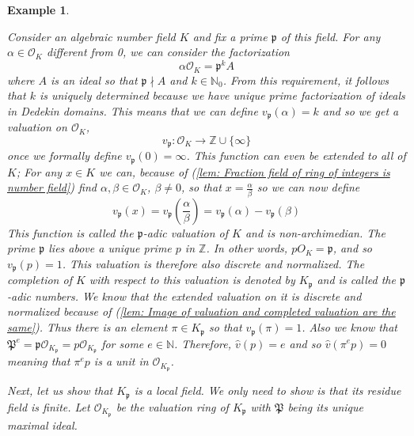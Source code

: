 \documentclass{article}
\newtheorem{example}{Example}[section]
\newcommand{\mfrak}[1]{\mathfrak{#1}}
\newcommand{\mcal}[1]{\mathcal{#1}}
\newcommand{\mbb}[1]{\mathbb{#1}}
\begin{document}
\begin{example}\label{ex: P-adic numbers}


    Consider an algebraic number field $K$ and fix a prime $\mfrak p$ of this field. For any $\alpha \in \mathcal O_K$ different from 0, we can consider the factorization
    $$\alpha \mcal O_K = \mfrak p^k A$$
    where $A$ is an ideal so that $\mfrak{p} \nmid A$ and $k \in \mbb N_0$. From this requirement, it follows that $k$ is uniquely determined because we have unique prime factorization of ideals in Dedekin domains. This means that we can define $v_\mfrak p(\alpha) = k$ and so we get a valuation on $\mcal O_K$,
    $$v_\mfrak p : \mathcal O_K \to \mbb{Z} \cup \{\infty\}$$
    once we formally define $v_\mfrak p(0) = \infty$. This function can even be extended to all of $K$; For any $x \in K$ we can, because of (\ref{lem: Fraction field of ring of integers is number field}) find $\alpha, \beta \in \mathcal O_K$, $\beta \neq 0$, so that $x = \frac{\alpha}{\beta}$ so we can now define
    $$v_\mfrak p(x) = v_\mfrak p \left(\frac{\alpha}{\beta}\right) = v_\mfrak p(\alpha) - v_\mfrak p(\beta)$$    
    This function is called the $\mfrak p$-adic valuation of $K$ and is non-archimedian. The prime $\mfrak p$ lies above a unique prime $p$ in $\mbb Z$. In other words, $p O_K = \mfrak p$, and so $v_\mfrak p(p) = 1$. This valuation is therefore also discrete and normalized. The completion of $K$ with respect to this valuation is denoted by $K_\mfrak p$ and is called the $\mfrak p$-adic numbers. We know that the extended valuation on it is discrete and normalized because of (\ref{lem: Image of valuation and completed valuation are the same}). Thus there is an element $\pi \in K_\mfrak p$ so that $v_\mfrak p(\pi) = 1$. Also we know that $\mfrak P^e = \mfrak p \mcal O_{K_\mfrak p} = p \mcal O_{K_\mfrak p}$ for some $e \in \mbb N$. Therefore, $\hat v(p) = e$ and so $\hat v(\pi^e p) = 0$ meaning that $\pi^e p$ is a unit in $\mcal O_{K_\mfrak p}$. 
    
    
    
    
    Next, let us show that $K_{\mfrak p}$ is a local field. We only need to show is that its residue field is finite. Let $\mcal O_{K_\mfrak p}$ be the valuation ring of $K_\mfrak p$ with $\mfrak P$ being its unique maximal ideal. 
    
    
    
    
    

\end{example}
\end{document}
